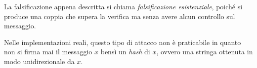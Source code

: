 	\begin{notz}
	La falsificazione appena descritta si chiama \emph{falsificazione esistenziale}, poiché si produce una coppia che supera la verifica ma senza avere alcun controllo sul messaggio.
	\end{notz}
	\noindent
	Nelle implementazioni reali, questo tipo di attacco non è praticabile in quanto non si firma mai il messaggio \(x\) bensì un \emph{hash} di \(x\), ovvero una stringa ottenuta in modo unidirezionale da \(x\).